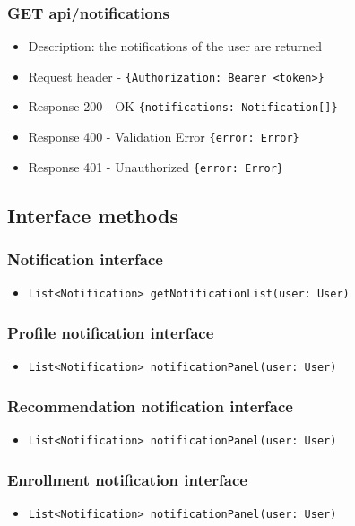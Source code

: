 \subsubsection{GET api/notifications}
\begin{itemize}
    \item Description: the notifications of the user are returned
    \item Request header - \verb|{Authorization: Bearer <token>}|
    \item Response 200 - OK \verb|{notifications: Notification[]}|
    \item Response 400 - Validation Error \verb|{error: Error}|
    \item Response 401 - Unauthorized \verb|{error: Error}|
\end{itemize}

\subsection{Interface methods}

\subsubsection{Notification interface}
\begin{itemize}
    \item \verb|List<Notification> getNotificationList(user: User)|
\end{itemize}

\subsubsection{Profile notification interface}
\begin{itemize}
    \item \verb|List<Notification> notificationPanel(user: User)|
\end{itemize}

\subsubsection{Recommendation notification interface}
\begin{itemize}
    \item \verb|List<Notification> notificationPanel(user: User)|
\end{itemize}

\subsubsection{Enrollment notification interface}
\begin{itemize}
    \item \verb|List<Notification> notificationPanel(user: User)|
\end{itemize}

